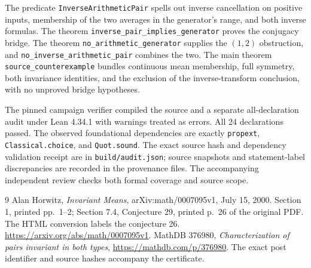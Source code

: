 \documentclass[11pt]{article}
\begin{document}
The predicate \texttt{InverseArithmeticPair} spells out inverse cancellation on positive inputs, membership of the two averages in the generator's range, and both inverse formulas. The theorem \texttt{inverse\_pair\_implies\_generator} proves the conjugacy bridge. The theorem \texttt{no\_arithmetic\_generator} supplies the $(1,2)$ obstruction, and \texttt{no\_inverse\_arithmetic\_pair} combines the two. The main theorem \texttt{source\_counterexample} bundles continuous mean membership, full symmetry, both invariance identities, and the exclusion of the inverse-transform conclusion, with no unproved bridge hypotheses.

The pinned campaign verifier compiled the source and a separate all-declaration audit under Lean 4.34.1 with warnings treated as errors. All 24 declarations passed. The observed foundational dependencies are exactly \texttt{propext}, \texttt{Classical.choice}, and \texttt{Quot.sound}. The exact source hash and dependency validation receipt are in \texttt{build/audit.json}; source snapshots and statement-label discrepancies are recorded in the provenance files. The accompanying independent review checks both formal coverage and source scope.

\begin{thebibliography}{9}
 Alan Horwitz, \emph{Invariant Means}, arXiv:math/0007095v1, July 15, 2000. Section 1, printed pp.~1--2; Section 7.4, Conjecture 29, printed p.~26 of the original PDF. The HTML conversion labels the conjecture 26. \url{https://arxiv.org/abs/math/0007095v1}.
 MathDB 376980, \emph{Characterization of pairs invariant in both types}, \url{https://mathdb.com/p/376980}. The exact post identifier and source hashes accompany the certificate.
\end{thebibliography}
\end{document}
